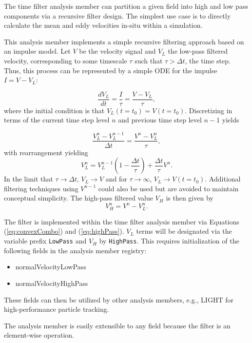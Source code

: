 The time filter analysis member can partition a given field into high and low pass 
components via a recursive filter design.  The simplest use case is to directly
calculate the mean and eddy velocities in-situ within a simulation.  

This analysis member implements a simple recursive filtering approach based on an impulse model.
Let $V$ be the velocity signal and $V_L$ the low-pass filtered velocity, corresponding to some 
timescale $\tau$ such that $\tau > \Delta t$, the time step.  Thus, this process can be represented by a simple ODE
for the impulse $I = V-V_L$: 

\begin{equation}
  \frac{dV_L}{dt} = \frac{I}{\tau} = \frac{V-V_L}{\tau},
\end{equation}
where the initial condition is that $V_L(t=t_0) = V(t=t_0)$.  
Discretizing in terms of the current time step level $n$ and previous time step level $n-1$ yields

\begin{equation}
  \frac{V_L^n-V_L^{n-1}}{\Delta t} = \frac{V^n -V_L^n}{\tau},
\end{equation}
with rearrangement yielding
\begin{equation}
  V_L^n = V_L^{n-1}\left(1-\frac{\Delta t}{\tau}\right) + \frac{\Delta t}{\tau} V^n.
  \label{eq:convexCombo}
\end{equation}
In the limit that $\tau \rightarrow \Delta t$, $V_L \rightarrow V$ and for 
$\tau \rightarrow \infty$, $V_L \rightarrow V(t=t_0)$.  Additional filtering techniques 
using $V^{n-1}$ could also be used but are avoided to maintain conceptual
simplicity.
The high-pass filtered value $V_H$ is then given by 
\begin{equation}
  V_H^n = V^n - V_L^n.
  \label{eq:highPass}
\end{equation}

The filter is implemented within the time filter analysis member via Equations (\ref{eq:convexCombo}) and (\ref{eq:highPass}).  $V_L$ terms will be designated via the 
variable prefix \verb+LowPass+ and $V_H$ by \verb+HighPass+.  This requires initialization of the following fields in the analysis member registry: 
\begin{itemize}
  \item normalVelocityLowPass 
  \item normalVelocityHighPass 
\end{itemize}
These fields can then be utilized by other analysis members, e.g., LIGHT for high-performance particle tracking.

The analysis member is easily extensible to any field because the filter is an element-wise operation.
